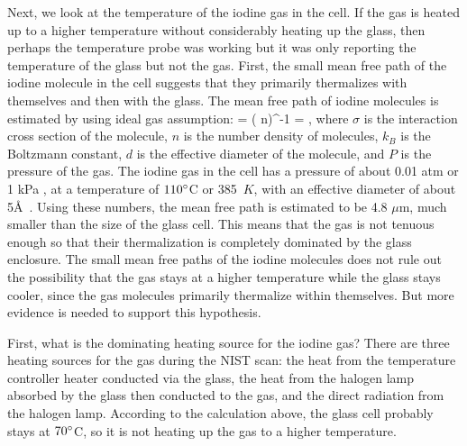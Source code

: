 Next, we look at the temperature of the iodine gas in the cell. If the
gas is heated up to a higher temperature without considerably heating
up the glass, then perhaps the temperature probe was working but it
was only reporting the temperature of the glass but not the
gas. First, the small mean free path of the iodine molecule in the
cell suggests that they primarily thermalizes with themselves and then
with the glass. The mean free path of iodine molecules is estimated by
using ideal gas assumption:
\beq
\lambda = ( \sigma \cdot n)^{-1} = ,
\eeq
where $\sigma$ is the interaction cross section of the molecule, $n$
is the number density of molecules, $k_B$ is the Boltzmann constant,
$d$ is the effective diameter of the molecule, and $P$ is the pressure
of the gas. The iodine gas in the cell has a pressure of about 0.01
atm or 1 kPa \citep{butler1996}, at a temperature of $110^{\circ}$C or
385~$K$, with an effective diameter of about 5\AA\
\citep{JUHOLA1975437,topley1926size}. Using these numbers, the mean
free path is estimated to be 4.8 $\mu$m, much smaller than the size of
the glass cell. This means that the gas is not tenuous enough so that
their thermalization is completely dominated by the glass
enclosure. The small mean free paths of the iodine molecules does not
rule out the possibility that the gas stays at a higher temperature
while the glass stays cooler, since the gas molecules primarily
thermalize within themselves. But more evidence is needed to support
this hypothesis.

First, what is the dominating heating source for the iodine gas? There are three
heating sources for the gas during the NIST scan: the heat from the
temperature controller heater conducted via the glass, the heat from
the halogen lamp absorbed by the glass then conducted to the gas,
and the direct radiation from the halogen lamp. According to the
calculation above, the glass cell probably stays at $70^{\circ}$C, so
it is not heating up the gas to a higher temperature. 

